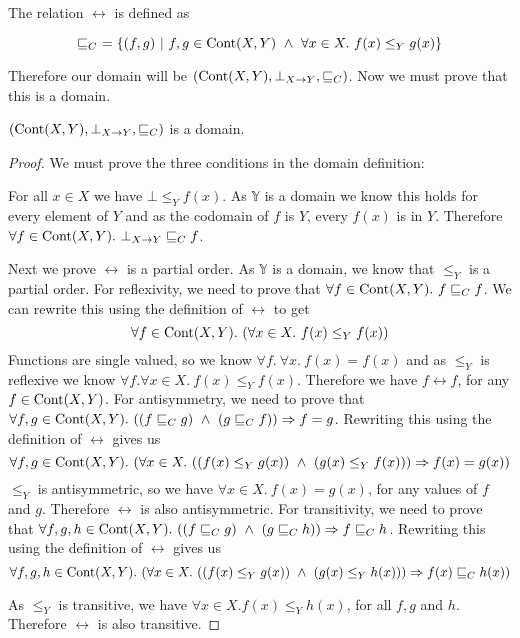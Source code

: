 The relation $\rel$ is defined as

\[ \sqsubseteq_{C}  \ = \{ (f , g) \ | \ f,g \in \operatorname{Cont}(X,Y) \ \wedge \ \forall x \in X. \ f(x) \leq_Y g(x)\} \]

Therefore our domain will be $(\operatorname{Cont}(X,Y), \bot_{X \to Y}, \sqsubseteq_C)$. Now we must prove that this is a domain.

\vspace{0.5cm}

\begin{lem}
$(\operatorname{Cont}(X,Y), \bot_{X \to Y}, \sqsubseteq_C)$ is a domain.
\end{lem}

\begin{proof}
We must prove the three conditions in the domain definition:

For all $x \in X$ we have $\bot \leq_Y f(x)$. As $\mathbb{Y}$ is a domain we know this holds for every element of $Y$ and as the codomain of $f$ is $Y$, every $f(x)$ is in $Y$. Therefore $\forall f \in \operatorname{Cont}(X,Y). \ \bot_{X \to Y} \sqsubseteq_{C} f$.

Next we prove $\rel$ is a partial order. As $\mathbb{Y}$ is a domain, we know that $\leq_Y$ is a partial order. For reflexivity, we need to prove that $\forall f \in \operatorname{Cont}(X,Y). \ f \sqsubseteq_{C} f$. We can rewrite this using the definition of $\rel$ to get 
\[\forall f \in \operatorname{Cont}(X,Y). \ (\forall x \in X. \ f(x) \leq_Y f(x))\]
 Functions are single valued, so we know $\forall f. \ \forall x. \ f(x) = f(x)$ and as $\leq_Y$ is reflexive we know $\forall f. \forall x \in X. \ f(x) \leq_Y f(x)$. Therefore we have $f \rel f$, for any $f \in \operatorname{Cont}(X,Y)$. For antisymmetry, we need to prove that $\forall f,g \in \operatorname{Cont}(X,Y). \ ((f \sqsubseteq_{C} g) \ \wedge \ (g \sqsubseteq_{C} f)) \Rightarrow f = g$. Rewriting this using the definition of $\rel$ gives us
 \[\forall f,g \in \cont(X,Y). \ (\forall x \in X. \ ((f(x) \leq_Y g(x)) \ \wedge \ (g(x) \leq_Y f(x))) \Rightarrow f(x) = g(x))\] 
 $\leq_Y$ is antisymmetric, so we have $\forall x \in X. \ f(x) = g(x)$, for any values of $f$ and $g$. Therefore $\rel$ is also antisymmetric. For transitivity, we need to prove that $\forall f,g,h \in \operatorname{Cont}(X,Y). \ ((f \sqsubseteq_{C} g) \  \wedge \ (g \sqsubseteq_{C} h)) \Rightarrow f \sqsubseteq_{C} h$. Rewriting this using the definition of $\rel$ gives us 
 \[\forall f,g,h \in \cont(X,Y). \ (\forall x \in X. \ ((f(x) \leq_Y g(x)) \ \wedge \ (g(x) \leq_Y h(x))) \Rightarrow f(x) \rel h(x)) \]
 
As $\leq_Y$ is transitive, we have $\forall x \in X.f(x) \leq_Y h(x)$, for all $f, g$ and $h$. Therefore $\rel$ is also transitive. 


\end{proof}
